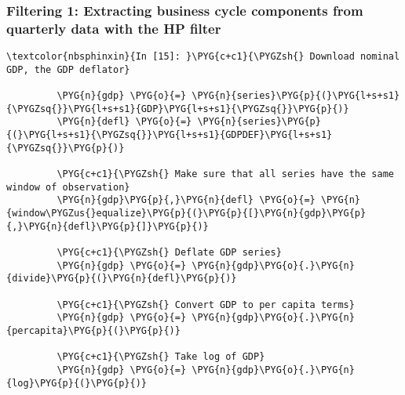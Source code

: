 \documentclass[letterpaper,10pt,openany,oneside,english]{sphinxmanual}
\begin{document}
\subsubsection{Filtering 1: Extracting business cycle components from quarterly data with the HP filter}
\label{\detokenize{fredpy_examples:Filtering-1:-Extracting-business-cycle-components-from-quarterly-data-with-the-HP-filter}}
\begin{Verbatim}[commandchars=\\\{\}]
\textcolor{nbsphinxin}{In [15]: }\PYG{c+c1}{\PYGZsh{} Download nominal GDP, the GDP deflator}
         
         \PYG{n}{gdp} \PYG{o}{=} \PYG{n}{series}\PYG{p}{(}\PYG{l+s+s1}{\PYGZsq{}}\PYG{l+s+s1}{GDP}\PYG{l+s+s1}{\PYGZsq{}}\PYG{p}{)}
         \PYG{n}{defl} \PYG{o}{=} \PYG{n}{series}\PYG{p}{(}\PYG{l+s+s1}{\PYGZsq{}}\PYG{l+s+s1}{GDPDEF}\PYG{l+s+s1}{\PYGZsq{}}\PYG{p}{)}
         
         \PYG{c+c1}{\PYGZsh{} Make sure that all series have the same window of observation}
         \PYG{n}{gdp}\PYG{p}{,}\PYG{n}{defl} \PYG{o}{=} \PYG{n}{window\PYGZus{}equalize}\PYG{p}{(}\PYG{p}{[}\PYG{n}{gdp}\PYG{p}{,}\PYG{n}{defl}\PYG{p}{]}\PYG{p}{)}
         
         \PYG{c+c1}{\PYGZsh{} Deflate GDP series}
         \PYG{n}{gdp} \PYG{o}{=} \PYG{n}{gdp}\PYG{o}{.}\PYG{n}{divide}\PYG{p}{(}\PYG{n}{defl}\PYG{p}{)}
         
         \PYG{c+c1}{\PYGZsh{} Convert GDP to per capita terms}
         \PYG{n}{gdp} \PYG{o}{=} \PYG{n}{gdp}\PYG{o}{.}\PYG{n}{percapita}\PYG{p}{(}\PYG{p}{)}
         
         \PYG{c+c1}{\PYGZsh{} Take log of GDP}
         \PYG{n}{gdp} \PYG{o}{=} \PYG{n}{gdp}\PYG{o}{.}\PYG{n}{log}\PYG{p}{(}\PYG{p}{)}
\end{Verbatim}
\end{document}
